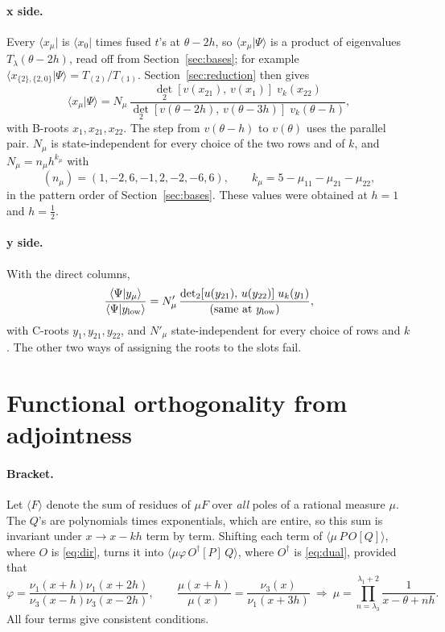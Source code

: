 \documentclass[11pt]{article}
\newcommand{\bra}[1]{\langle #1|}
\begin{document}
\paragraph{x side.} Every $\bra{x_\mu}$ is $\bra{x_0}$ times fused $t$'s at $\theta-2h$, so $\langle x_\mu|\Psi\rangle$ is a product of eigenvalues $T_\lambda(\theta-2h)$, read off from Section~\ref{sec:bases}; for example $\langle x_{\{2\},\{2,0\}}|\Psi\rangle=T_{(2)}/T_{(1)}$. Section~\ref{sec:reduction} then gives
\begin{equation}
\langle x_\mu|\Psi\rangle=N_\mu\,\frac{\det_2[v(x_{21}),\,v(x_1)]\;v_k(x_{22})}{\det_2[v(\theta-2h),\,v(\theta-3h)]\;v_k(\theta-h)} ,
\end{equation}
with B-roots $x_1,x_{21},x_{22}$. The step from $v(\theta-h)$ to $v(\theta)$ uses the parallel pair. $N_\mu$ is state-independent for every choice of the two rows and of $k$, and $N_\mu=n_\mu h^{k_\mu}$ with
\[
(n_\mu)=(1,-2,6,-1,2,-2,-6,6),\qquad k_\mu=5-\mu_{11}-\mu_{21}-\mu_{22},
\]
in the pattern order of Section~\ref{sec:bases}. These values were obtained at $h=1$ and $h=\tfrac12$.

\paragraph{y side.} With the direct columns,
\begin{equation}
\frac{\langle\Psi|y_\mu\rangle}{\langle\Psi|y_{\rm low}\rangle}=N'_\mu\,\frac{\det_2[u(y_{21}),\,u(y_{22})]\;u_k(y_1)}{(\text{same at }y_{\rm low})},
\end{equation}
with C-roots $y_1,y_{21},y_{22}$, and $N'_\mu$ state-independent for every choice of rows and $k$. The other two ways of assigning the roots to the slots fail.

\section{Functional orthogonality from adjointness}\label{sec:orth}

\paragraph{Bracket.} Let $\langle F\rangle$ denote the sum of residues of $\mu F$ over \emph{all} poles of a rational measure $\mu$. The $Q$'s are polynomials times exponentials, which are entire, so this sum is invariant under $x\to x-kh$ term by term. Shifting each term of $\langle\mu\,P\,O[Q]\rangle$, where $O$ is \eqref{eq:dir}, turns it into $\langle\mu\varphi\,O^\dagger[P]\,Q\rangle$, where $O^\dagger$ is \eqref{eq:dual}, provided that
\begin{equation}
\varphi=\frac{\nu_1(x+h)\nu_1(x+2h)}{\nu_3(x-h)\nu_3(x-2h)},\qquad \frac{\mu(x+h)}{\mu(x)}=\frac{\nu_3(x)}{\nu_1(x+3h)}\ \Rightarrow\ \mu=\prod_{n=\lambda_3}^{\lambda_1+2}\frac1{x-\theta+nh}.
\end{equation}
All four terms give consistent conditions.
\end{document}
